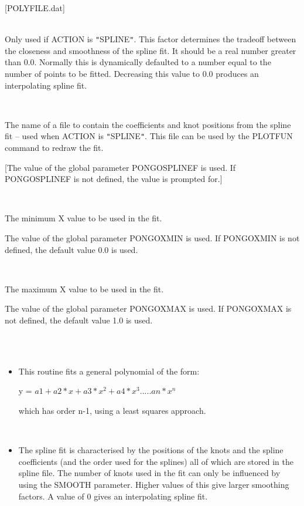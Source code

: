 \documentclass[twoside,11pt]{article}
\renewcommand{\_}{\texttt{\symbol{95}}}
\newcommand{\sstsubsection}[1]{ \item[{#1}] \mbox{} \\}
\newcommand{\sstnotes}[1]{\item[Notes:] \mbox{} \\[1.3ex] #1}
\newcommand{\sstitemlist}[1]{
  \mbox{} \\
  \vspace{-3.5ex}
  \begin{itemize}
     #1
  \end{itemize}
}
\newcommand{\sstitem}{\item}
\newcommand{\sstsubsection}[1]{\item[{#1}]}
\newcommand{\sstnotes}[1]{\item[Notes:] #1 }
\newcommand{\sstitemlist}[1]{
      \begin{itemize}
         #1
      \end{itemize}
      \\
   }
\newcommand{\sstitem}{\item}
\begin{document}
{{{         [POLYFILE.dat]
      }
      \sstsubsection{
         SMOOTH = \_REAL (Read)
      }{
         Only used if ACTION is {\tt "}SPLINE{\tt "}. This factor determines the
         tradeoff between the closeness and smoothness of the spline
         fit. It should be a real number greater than 0.0. Normally this
         is dynamically defaulted to a number equal to the number of
         points to be fitted. Decreasing this value to 0.0 produces an
         interpolating spline fit.
      }
      \sstsubsection{
         SPLINEFILE = \_CHAR (Read)
      }{
         The name of a file to contain the coefficients and knot
         positions from the spline fit -- used when ACTION is
         {\tt "}SPLINE{\tt "}. This file can be used by the PLOTFUN command to
         redraw the fit.

         [The value of the global parameter PONGO\_SPLINEF is used. If
         PONGO\_SPLINEF is not defined, the value is prompted for.]
      }
      \sstsubsection{
         XMIN = \_REAL (Read)
      }{
         The minimum X value to be used in the fit.

         The value of the global parameter PONGO\_XMIN is used. If
         PONGO\_XMIN is not defined, the default value 0.0 is used.
      }
      \sstsubsection{
         XMAX = \_REAL (Read)
      }{
         The maximum X value to be used in the fit.

         The value of the global parameter PONGO\_XMAX is used. If
         PONGO\_XMAX is not defined, the default value 1.0 is used.
      }
   }
\newpage
   \sstnotes{
      \sstitemlist{

         \sstitem
         This routine fits a general polynomial of the form:

            y = $a1 + a2*x + a3*x^{2} + a4*x^{3} ..... an*x^{n}$

         which has order n-1, using a least squares approach.
      }

      \sstitemlist{

         \sstitem
         The spline fit is characterised by the positions of the knots and
         the spline coefficients (and the order used for the splines) all
         of which are stored in the spline file. The number of knots used
         in the fit can only be influenced by using the SMOOTH
         parameter. Higher values of this give larger smoothing factors. A
         value of 0 gives an interpolating spline fit.
      }
   }
}
\end{document}
